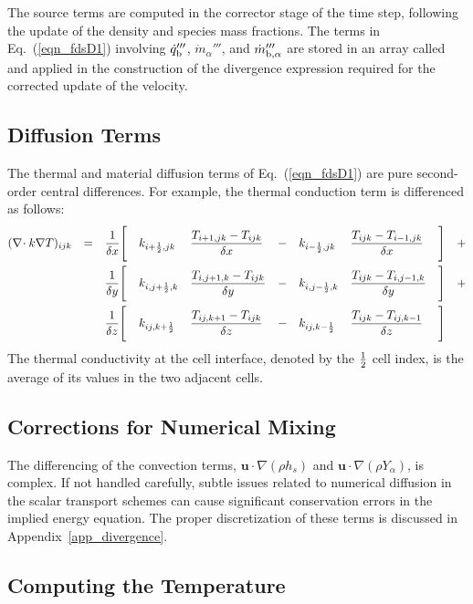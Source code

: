 The source terms are computed in the corrector stage of the time step, following the update of the density and species mass fractions. The terms in Eq.~(\ref{eqn_fdsD1}) involving $\dot{q}_{\rm b}'''$, $\dot{m}_\alpha'''$, and $\dot{m}_{\rm b,\alpha}'''$ are stored in an array called  and applied in the construction of the divergence expression required for the corrected update of the velocity.

\subsection{Diffusion Terms}
\label{div_discret}

The thermal and material diffusion terms of Eq.~(\ref{eqn_fdsD1}) are pure second-order central differences. For example, the thermal
conduction term is differenced as follows:
\begin{align}
(\nabla\!\cdot k \nabla T)_{ijk}
            &&=&&& \frac{1}{\delta x} \Bigg[ && k_{i+\frac{1}{2},jk} && \frac{T_{i+1,jk}-T_{ijk}}{\delta x}  &&-&& k_{i-\frac{1}{2},jk}  && \frac{T_{ijk}-T_{i-1,jk}}{\delta x}  &&\Bigg]  &+ \notag \\
            && &&& \frac{1}{\delta y} \Bigg[ && k_{i,j+\frac{1}{2},k}&& \frac{T_{i,j+1,k}-T_{ijk}}{\delta y} &&-&& k_{i,j-\frac{1}{2},k} && \frac{T_{ijk}-T_{i,j-1,k}}{\delta y} &&\Bigg]  &+ \notag \\
            && &&& \frac{1}{\delta z} \Bigg[ && k_{ij,k+\frac{1}{2}} && \frac{T_{ij,k+1}-T_{ijk}}{\delta z}  &&-&& k_{ij,k-\frac{1}{2}}  && \frac{T_{ijk}-T_{ij,k-1}}{\delta z}  &&\Bigg]  &
\end{align}
The thermal conductivity at the cell interface, denoted by the $\frac{1}{2}$ cell index, is the average of its values in the two adjacent cells.

\subsection{Corrections for Numerical Mixing}

The differencing of the convection terms, $\mathbf{u} \cdot\nabla (\rho h_s)$ and $\mathbf{u} \cdot \nabla (\rho Y_\alpha)$, is complex.  If not handled carefully, subtle issues related to numerical diffusion in the scalar transport schemes can cause significant conservation errors in the implied energy equation.  The proper discretization of these terms is discussed in Appendix~\ref{app_divergence}.

\subsection{Computing the Temperature}

